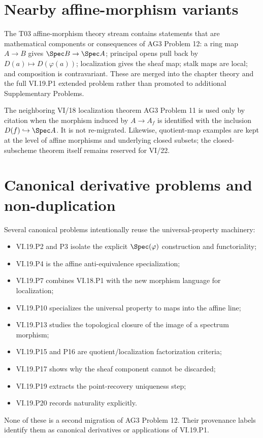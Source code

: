 \section*{Nearby affine-morphism variants}
The T03 affine-morphism theory stream contains statements that are mathematical components or
consequences of AG3 Problem 12: a ring map $A\to B$ gives $\Spec B\to\Spec A$; principal
opens pull back by $D(a)\mapsto D(\varphi(a))$; localization gives the sheaf map; stalk maps
are local; and composition is contravariant.  These are merged into the chapter theory and the
full VI.19.P1 extended problem rather than promoted to additional Supplementary Problems.

The neighboring VI/18 localization theorem AG3 Problem 11 is used only by citation when the
morphism induced by $A\to A_f$ is identified with the inclusion $D(f)\hookrightarrow\Spec A$.
It is not re-migrated.  Likewise, quotient-map examples are kept at the level of affine morphisms
and underlying closed subsets; the closed-subscheme theorem itself remains reserved for VI/22.

\section*{Canonical derivative problems and non-duplication}
Several canonical problems intentionally reuse the universal-property machinery:
\begin{itemize}
\item VI.19.P2 and P3 isolate the explicit $\Spec(\varphi)$ construction and functoriality;
\item VI.19.P4 is the affine anti-equivalence specialization;
\item VI.19.P7 combines VI.18.P1 with the new morphism language for localization;
\item VI.19.P10 specializes the universal property to maps into the affine line;
\item VI.19.P13 studies the topological closure of the image of a spectrum morphism;
\item VI.19.P15 and P16 are quotient/localization factorization criteria;
\item VI.19.P17 shows why the sheaf component cannot be discarded;
\item VI.19.P19 extracts the point-recovery uniqueness step;
\item VI.19.P20 records naturality explicitly.
\end{itemize}
None of these is a second migration of AG3 Problem 12.  Their provenance labels identify them
as canonical derivatives or applications of VI.19.P1.

